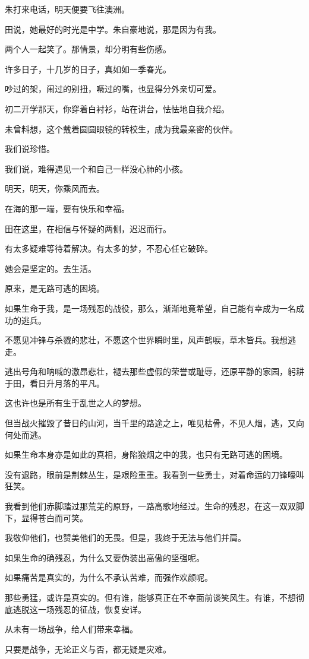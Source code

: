 \documentclass[12pt,a4paper]{article}
\def\blankrev{\vspace{1ex}}									%
\begin{document}
		朱打来电话，明天便要飞往澳洲。\par
		田说，她最好的时光是中学。朱自豪地说，那是因为有我。\par
		两个人一起笑了。那情景，却分明有些伤感。\par
		许多日子，十几岁的日子，真如如一季春光。\par
		吵过的架，闹过的别扭，噘过的嘴，也显得分外亲切可爱。\par
		初二开学那天，你穿着白衬衫，站在讲台，怯怯地自我介绍。\par
		未曾料想，这个戴着圆圆眼镜的转校生，成为我最亲密的伙伴。

		我们说珍惜。\par
		我们说，难得遇见一个和自己一样没心肺的小孩。

		明天，明天，你乘风而去。\par
		在海的那一端，要有快乐和幸福。

		田在这里，在相信与怀疑的两侧，迟迟而行。\par
		有太多疑难等待着解决。有太多的梦，不忍心任它破碎。

		她会是坚定的。去生活。

	\endwriting



		原来，是无路可逃的困境。

		\blankrev
		如果生命于我，是一场残忍的战役，那么，渐渐地竟希望，自己能有幸成为一名成功的逃兵。\par
		不愿见冲锋与杀戮的悲壮，不愿这个世界瞬时里，风声鹤唳，草木皆兵。我想逃走。\par
		逃出号角和呐喊的激昂悲壮，褪去那些虚假的荣誉或耻辱，还原平静的家园，躬耕于田，看日升月落的平凡。\par
		这也许也是所有生于乱世之人的梦想。\par
		但当战火摧毁了昔日的山河，当千里的路途之上，唯见枯骨，不见人烟，逃，又向何处而逃。\par
		如果生命本身亦是如此的真相，身陷狼烟之中的我，也只有无路可逃的困境。\par
		没有退路，眼前是荆棘丛生，是艰险重重。我看到一些勇士，对着命运的刀锋嚎叫狂笑。\par
		我看到他们赤脚踏过那荒芜的原野，一路高歌地经过。生命的残忍，在这一双双脚下，显得苍白而可笑。\par
		我敬仰他们，也赞美他们的无畏。但是，我终于无法与他们并肩。\par
		如果生命的确残忍，为什么又要伪装出高傲的坚强呢。\par
		如果痛苦是真实的，为什么不承认苦难，而强作欢颜呢。\par
		那些勇猛，或许是真实的。但有谁，能够真正在不幸面前谈笑风生。有谁，不想彻底逃脱这一场残忍的征战，恢复安详。\par
		从未有一场战争，给人们带来幸福。\par
		只要是战争，无论正义与否，都无疑是灾难。
\end{document}
